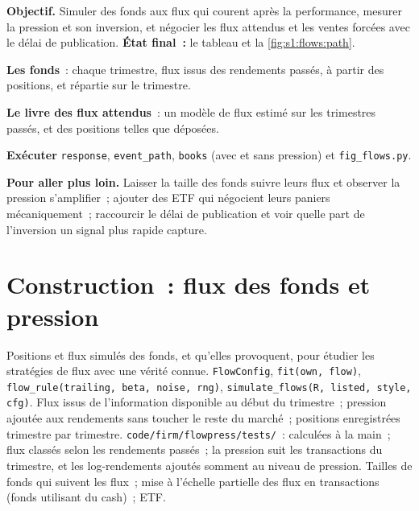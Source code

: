 \begin{tutorial}
\textbf{Objectif.} Simuler des fonds aux flux qui courent après la performance, mesurer la pression et son inversion, et négocier les flux attendus et les ventes forcées avec
le délai de publication. \textbf{État final~:} le tableau et la \cref{fig:s1:flows:path}.
\begin{tutsteps}
\item \textbf{Les fonds}~: chaque trimestre, flux issus des rendements passés,  à partir des positions, et  répartie sur le trimestre.
\label{lst:s1:flows:sim}
\item \textbf{Le livre des flux attendus}~: un modèle de flux estimé sur les trimestres passés, et des positions telles que déposées.
\label{lst:s1:flows:book}
\item \textbf{Exécuter} \texttt{response}, \texttt{event\_path}, \texttt{books} (avec et sans pression) et \texttt{fig\_flows.py}.
\end{tutsteps}
\textbf{Pour aller plus loin.} Laisser la taille des fonds suivre leurs flux et observer la pression s'amplifier~; ajouter des ETF qui négocient leurs paniers mécaniquement~; raccourcir le
délai de publication et voir quelle part de l'inversion un signal plus rapide capture.
\end{tutorial}

\section{Construction~: flux des fonds et pression}\label{bld:s1:flows:flowpress}

\begin{build}
 Positions et flux simulés des fonds,  et  qu'elles provoquent, pour étudier les stratégies de flux avec une vérité connue.
 \texttt{FlowConfig}, \texttt{fit(own, flow)}, \texttt{flow\_rule(trailing, beta, noise, rng)},
\texttt{simulate\_flows(R, listed, style, cfg)}.
 Flux issus de l'information disponible au début du trimestre~; pression ajoutée aux rendements sans toucher le reste du marché~; positions
enregistrées trimestre par trimestre.
 \texttt{code/firm/flowpress/tests/}~:  calculées à la main~; flux classés selon les rendements passés~; la pression suit les
transactions du trimestre, et les log-rendements ajoutés somment au niveau de pression.
 Tailles de fonds qui suivent les flux~; mise à l'échelle partielle des flux en transactions (fonds utilisant du cash)~; ETF.
\end{build}

